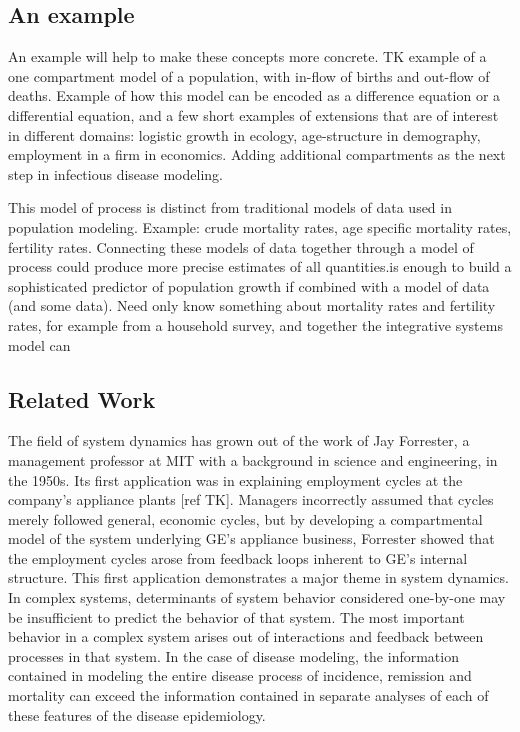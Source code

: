 \subsection{An example}
An example will help to make these concepts more concrete.  TK
example of a one compartment model of a population, with in-flow of
births and out-flow of deaths.  Example of how this model can be
encoded as a difference equation or a differential equation, and a few
short examples of extensions that are of interest in different
domains: logistic growth in ecology, age-structure in demography,
employment in a firm in economics.  Adding additional compartments as
the next step in infectious disease modeling.

This model of process is distinct from traditional models of data used
in population modeling.  Example: crude mortality rates, age specific
mortality rates, fertility rates.  Connecting these models of data
together through a model of process could produce more precise
estimates of all quantities.is enough to build a sophisticated
predictor of population growth if combined with a model of data (and
some data). Need only know something about mortality rates and
fertility rates, for example from a household survey, and together the
integrative systems model can 

\subsection{Related Work}

The field of system dynamics has grown out of the work of Jay Forrester, a
management professor at MIT with a background in science and
engineering, in the 1950s. Its first application was in explaining
employment cycles at the company's appliance plants [ref TK]. Managers
incorrectly assumed that cycles merely followed general, economic
cycles, but by developing a compartmental model of the system
underlying GE's appliance business, Forrester showed that the
employment cycles arose from feedback loops inherent to GE's internal
structure. This first application demonstrates a major theme in system
dynamics. In complex systems, determinants of system behavior
considered one-by-one may be insufficient to predict the behavior of
that system. The most important behavior in a complex system arises
out of interactions and feedback between processes in that system. In
the case of disease modeling, the information contained in modeling
the entire disease process of incidence, remission and mortality
can exceed the information contained in separate
analyses of each of these features of the disease epidemiology.

